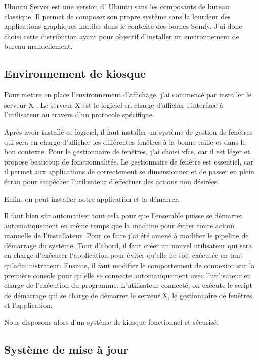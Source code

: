 Ubuntu Server est une version d’ Ubuntu sans les composants de bureau classique.
Il permet de composer son propre système sans la lourdeur des applications graphiques inutiles dans le contexte des bornes Somfy.
J'ai donc choisi cette distribution ayant pour objectif d'installer un environnement de bureau manuellement.

\subsection{Environnement de kiosque}

Pour mettre en place l'environnement d'affichage, j'ai commencé par installer le serveur X .
Le serveur X est le logiciel en charge d'afficher l'interface à l'utilisateur au travers d'un protocole spécifique.

Après avoir installé ce logiciel, il faut installer un système de gestion de fenêtres qui sera en charge d'afficher les différentes fenêtres à la bonne taille et dans le bon contexte.
Pour le gestionnaire de fenêtres, j'ai choisi xfce, car il est léger et propose beaucoup de fonctionnalités.
Le gestionnaire de fenêtre est essentiel, car il permet aux applications de correctement se dimensionner et de passer en plein écran pour empêcher l'utilisateur d'effectuer des actions non désirées.

Enfin, on peut installer notre application et la démarrer.

Il faut bien sûr automatiser tout cela pour que l'ensemble puisse se démarrer automatiquement en même temps que la machine pour éviter toute action manuelle de l'installateur.
Pour ce faire j'ai été amené à modifier le pipeline de démarrage du système.
Tout d'abord, il faut créer un nouvel utilisateur qui sera en charge d'exécuter l'application pour éviter qu'elle ne soit exécutée en tant qu'administrateur.
Ensuite, il faut modifier le comportement de connexion sur la première console pour qu'elle se connecte automatiquement avec l'utilisateur en charge de l'exécution du programme.
L'utilisateur connecté, on exécute le script de démarrage qui se charge de démarrer le serveur X, le gestionnaire de fenêtres et l'application.

Nous disposons alors d'un système de kiosque fonctionnel et sécurisé.

\subsection{Système de mise à jour}

